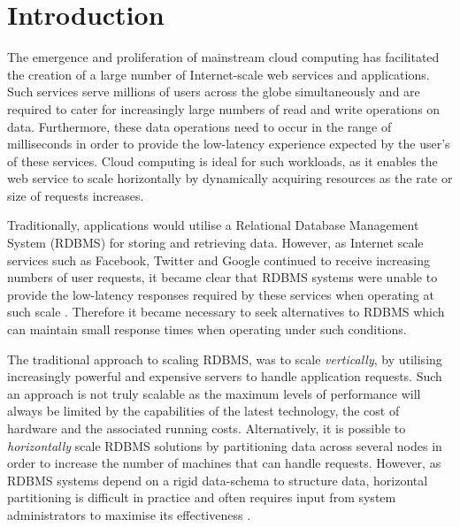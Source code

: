 \chapter{Introduction}
    \graphicspath{{Chapter1-Introduction/Figs/Vector/}{Chapter1-Introduction/Figs/}}
    
    The emergence and proliferation of mainstream cloud computing has facilitated the creation of a large number of Internet-scale web services and applications.  Such services serve millions of users across the globe simultaneously and are required to cater for increasingly large numbers of read and write operations on data.  Furthermore, these data operations need to occur in the range of milliseconds in order to provide the low-latency experience expected by the user's of these services.  Cloud computing is ideal for such workloads, as it enables the web service to scale horizontally by dynamically acquiring resources as the rate or size of requests increases.  
    
    Traditionally, applications would utilise a Relational Database Management System (RDBMS) for storing and retrieving data.  However, as Internet scale services such as Facebook, Twitter and Google continued to receive increasing numbers of user requests, it became clear that RDBMS systems were unable to provide the low-latency responses required by these services when operating at such scale \citep{DBLP:journals/corr/MoniruzzamanH13}.  Therefore it became necessary to seek alternatives to RDBMS which can maintain small response times when operating under such conditions.  
    
    The traditional approach to scaling RDBMS, was to scale \emph{vertically}, by utilising increasingly powerful and expensive servers to handle application requests.  Such an approach is not truly scalable as the maximum levels of performance will always be limited by the capabilities of the latest technology, the cost of hardware and the associated running costs.  Alternatively, it is possible to \emph{horizontally} scale RDBMS solutions by partitioning data across several nodes in order to increase the number of machines that can handle requests.  However, as RDBMS systems depend on a rigid data-schema to structure data, horizontal partitioning is difficult in practice and often requires input from system administrators to maximise its effectiveness \citep{Han:6106531}.  
    
